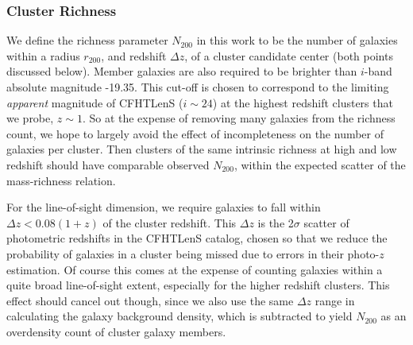 \subsubsection{Cluster Richness}
\label{rich}
We define the richness parameter $N_{200}$ in this work to be the number of galaxies within a radius $r_{200}$, and redshift $\Delta z$, of a cluster candidate center (both points discussed below). Member galaxies are also required to be brighter than $i$-band absolute magnitude -19.35. This cut-off is chosen to correspond to the limiting {\it apparent} magnitude of \ac{CFHTLenS} ($i \sim 24$) at the highest redshift clusters that we probe, $z \sim 1$. So at the expense of removing many galaxies from the richness count, we hope to largely avoid the effect of incompleteness on the number of galaxies per cluster. Then clusters of the same intrinsic richness at high and low redshift should have comparable observed $N_{200}$, within the expected scatter of the mass-richness relation.

For the line-of-sight dimension, we require galaxies to fall within $\Delta z < 0.08(1+z)$ of the cluster redshift. This $\Delta z$ is the 2$\sigma$ scatter of photometric redshifts in the \ac{CFHTLenS} catalog, chosen so that we reduce the probability of galaxies in a cluster being missed due to errors in their photo-$z$ estimation. Of course this comes at the expense of counting galaxies within a quite broad line-of-sight extent, especially for the higher redshift clusters. This effect should cancel out though, since we also use the same $\Delta z$ range in calculating the galaxy background density, which is subtracted to yield $N_{200}$ as an overdensity count of cluster galaxy members.

